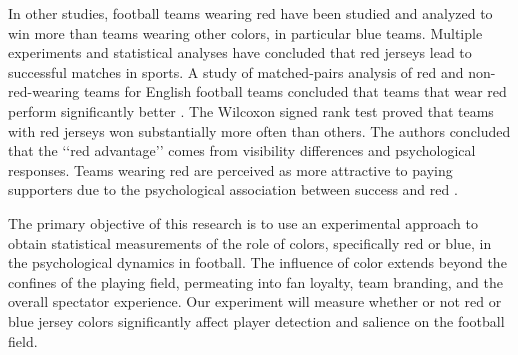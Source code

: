 In other studies, football teams wearing red have been studied and analyzed to win more than teams wearing other colors, in particular blue teams. Multiple experiments and statistical analyses have concluded that red jerseys lead to successful matches in sports. A study of matched-pairs analysis of red and non-red-wearing teams for English football teams concluded that teams that wear red perform significantly better \cite{red}. The Wilcoxon signed rank test proved that teams with red jerseys won substantially more often than others. The authors concluded that the ‘‘red advantage’’ comes from visibility differences and psychological responses. Teams wearing red are perceived as more attractive to paying supporters due to the psychological association between success and red \cite{red}. 

The primary objective of this research is to use an experimental approach to obtain statistical measurements of the role of colors, specifically red or blue, in the psychological dynamics in football. The influence of color extends beyond the confines of the playing field, permeating into fan loyalty, team branding, and the overall spectator experience. Our experiment will measure whether or not red or blue jersey colors significantly affect player detection and salience on the football field.






